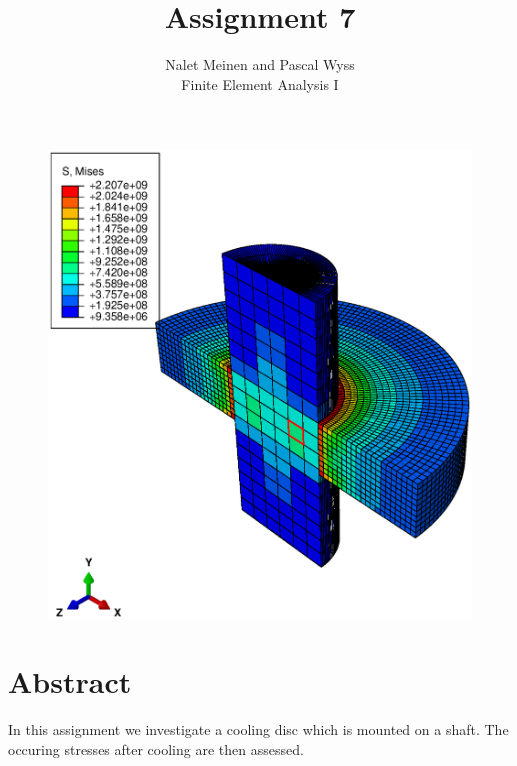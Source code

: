 \documentclass[12pt]{article}
\begin{document}


\title{Assignment 7}%
\author{Nalet Meinen and Pascal Wyss\\ %
Finite Element Analysis I
}
\maketitle

\begin{figure}[!htb]
  \centering
  \vspace*{1cm}
  \includegraphics[trim={1cm 2cm 2cm 2cm},clip,width=1.0\linewidth]{pics/stress3d}
  \label{fig:0}
\end{figure}

\newpage

\section*{Abstract}
In this assignment we investigate a cooling disc which is mounted on a shaft.
The occuring stresses after cooling are then assessed.
\end{document}
